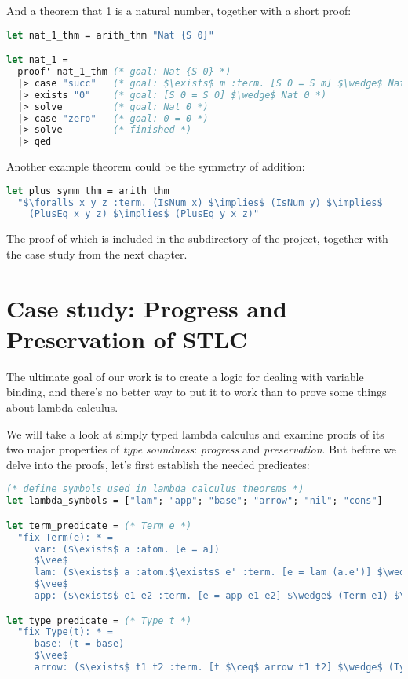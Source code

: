 \documentclass[english, mgr]{iithesis}
\newcommand{\lstt}[1]{\text{{\lstinline[columns=fixed,mathescape]|#1|}}}
\renewcommand{\it}[1]{\textit{#1}}
\begin{document}
And a theorem that 1 is a natural number, together with a short proof:
\begin{lstlisting}[mathescape, language=OCaml, escapebegin=\color{codegreen}]
let nat_1_thm = arith_thm "Nat {S 0}"

let nat_1 =
  proof' nat_1_thm (* goal: Nat {S 0} *)
  |> case "succ"   (* goal: $\exists$ m :term. [S 0 = S m] $\wedge$ Nat m *)
  |> exists "0"    (* goal: [S 0 = S 0] $\wedge$ Nat 0 *)
  |> solve         (* goal: Nat 0 *)
  |> case "zero"   (* goal: 0 = 0 *)
  |> solve         (* finished *)
  |> qed
\end{lstlisting}
Another example theorem could be the symmetry of addition:
\begin{lstlisting}[mathescape, language=OCaml, escapebegin=\color{codepurple}]
let plus_symm_thm = arith_thm
  "$\forall$ x y z :term. (IsNum x) $\implies$ (IsNum y) $\implies$
    (PlusEq x y z) $\implies$ (PlusEq y x z)"
\end{lstlisting}
The proof of which is included in the \lstt{examples} subdirectory of the project,
together with the case study from the next chapter.
\chapter{Case study: Progress and Preservation of STLC}

The ultimate goal of our work is to create a logic for dealing with variable binding,
and there's no better way to put it to work than to prove some things about lambda calculus.

We will take a look at simply typed lambda calculus and examine proofs of
its two major properties of \it{type soundness}: \it{progress} and \it{preservation}.
But before we delve into the proofs, let's first establish the needed predicates:
\begin{lstlisting}[mathescape,language=OCaml, escapebegin=\color{codepurple}]
(* define symbols used in lambda calculus theorems *)
let lambda_symbols = ["lam"; "app"; "base"; "arrow"; "nil"; "cons"]

let term_predicate = (* Term e *)
  "fix Term(e): * =
     var: ($\exists$ a :atom. [e = a])
     $\vee$
     lam: ($\exists$ a :atom.$\exists$ e' :term. [e = lam (a.e')] $\wedge$ (Term e'))
     $\vee$
     app: ($\exists$ e1 e2 :term. [e = app e1 e2] $\wedge$ (Term e1) $\wedge$ (Term e2))"

let type_predicate = (* Type t *)
  "fix Type(t): * =
     base: (t = base)
     $\vee$
     arrow: ($\exists$ t1 t2 :term. [t $\ceq$ arrow t1 t2] $\wedge$ (Type t1) $\wedge$ (Type t2))"
\end{lstlisting}
\end{document}
